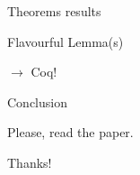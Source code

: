 \documentclass[xcolor={dvipsnames}]{beamer}
\begin{document}
\begin{frame}{Theorems}
results

\end{frame}

\begin{frame}{Flavourful Lemma(s)}

$\longrightarrow$ Coq!

\end{frame}

\begin{frame}{Conclusion}

  Please, read the paper.


Thanks!

\end{frame}
\end{document}
